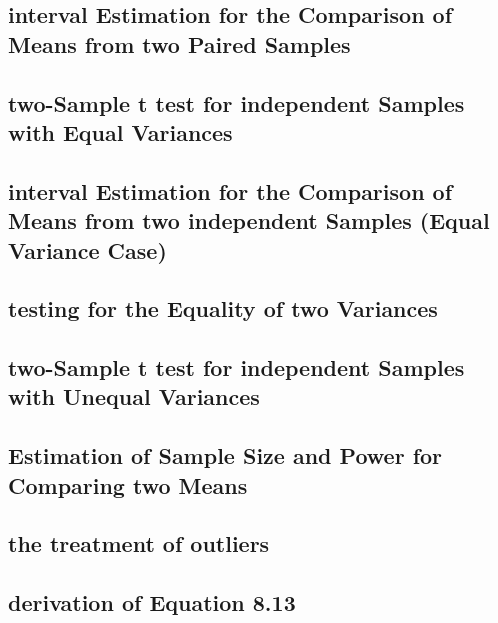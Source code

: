 \documentclass[12pt,]{article}
\theoremstyle{definition}
\theoremstyle{definition}
\theoremstyle{definition}
\theoremstyle{remark}
\begin{document}
\subsection{interval Estimation for the Comparison of Means from two
Paired
Samples}\label{interval-estimation-for-the-comparison-of-means-from-two-paired-samples}

\subsection{two-Sample t test for independent Samples with Equal
Variances}\label{two-sample-t-test-for-independent-samples-with-equal-variances}

\subsection{interval Estimation for the Comparison of Means from two
independent Samples (Equal Variance
Case)}\label{interval-estimation-for-the-comparison-of-means-from-two-independent-samples-equal-variance-case}

\subsection{testing for the Equality of two
Variances}\label{testing-for-the-equality-of-two-variances}

\subsection{two-Sample t test for independent Samples with Unequal
Variances}\label{two-sample-t-test-for-independent-samples-with-unequal-variances}

\subsection{Estimation of Sample Size and Power for Comparing two
Means}\label{estimation-of-sample-size-and-power-for-comparing-two-means}

\subsection{the treatment of outliers}\label{the-treatment-of-outliers}

\subsection{derivation of Equation
8.13}\label{derivation-of-equation-8.13}
\end{document}
